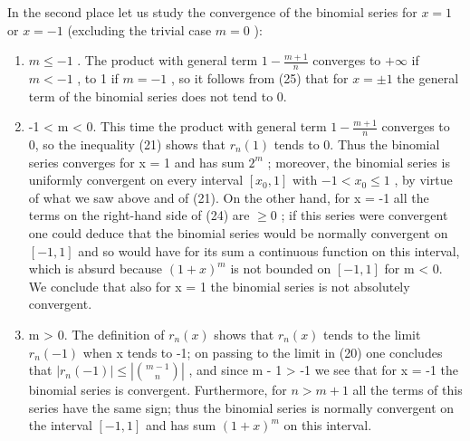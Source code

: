 In the second place let us study the convergence of the binomial series for \(x = 1\) or \(x = -1\) (excluding the trivial case \(m = 0\) ):

\begin{enumerate}
\def\labelenumi{\alph{enumi})}
\item
  \(m \leqslant -1\) . The product with general term \(1 - \frac{m + 1}{n}\) converges to \(+\infty\) if \(m < -1\) , to 1 if \(m = -1\) , so it follows from (25) that for \(x = \pm 1\) the general term of the binomial series does not tend to 0.
\item
  -1 \textless{} m \textless{} 0. This time the product with general term \(1 - \frac{m + 1}{n}\) converges to 0, so the inequality (21) shows that \(r_{n}(1)\) tends to 0. Thus the binomial series converges for x = 1 and has sum \(2^{m}\) ; moreover, the binomial series is uniformly convergent on every interval \([x_{0}, 1]\) with \(-1 < x_{0} \leqslant 1\) , by virtue of what we saw above and of (21). On the other hand, for x = -1 all the terms on the right-hand side of (24) are \(\geqslant 0\) ; if this series were convergent one could deduce that the binomial series would be normally convergent on \([-1, 1]\) and so would have for its sum a continuous function on this interval, which is absurd because \((1 + x)^{m}\) is not bounded on \([-1, 1]\) for m \textless{} 0. We conclude that also for x = 1 the binomial series is not absolutely convergent.
\item
  m \textgreater{} 0. The definition of \(r_{n}(x)\) shows that \(r_{n}(x)\) tends to the limit \(r_{n}(-1)\) when x tends to -1; on passing to the limit in (20) one concludes that \(|r_{n}(-1)| \leqslant \left|\binom{m-1}{n}\right|\) , and since m - 1 \textgreater{} -1 we see that for x = -1 the binomial series is convergent. Furthermore, for \(n > m + 1\) all the terms of this series have the same sign; thus the binomial series is normally convergent on the interval \([-1, 1]\) and has sum \((1 + x)^{m}\) on this interval.
\end{enumerate}

